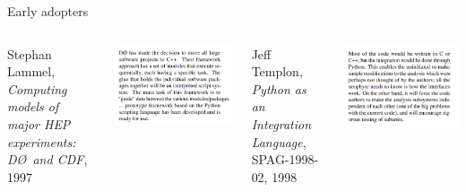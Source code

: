 \documentclass[aspectratio=169]{beamer}
\begin{document}
\begin{frame}{Early adopters}
\vspace{0.5 cm}
\begin{columns}[t]
Stephan Lammel, {\it Computing models of major HEP experiments: D\O\ and CDF}, 1997

\vspace{0.25 cm}
\includegraphics[width=\linewidth]{PLOTS/early-python-d0.png}

Jeff Templon, {\it Python as an Integration Language}, SPAG-1998-02, 1998

\vspace{0.25 cm}
\includegraphics[width=\linewidth]{PLOTS/early-python-halla.png}

\end{columns}
\end{frame}
\end{document}
